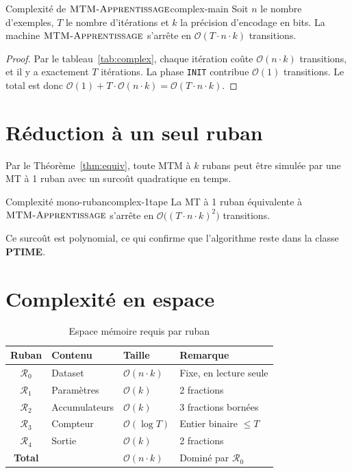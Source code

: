 \documentclass[12pt, a4paper, oneside]{report}
\newcommand{\mtmlong}{\textsc{MTM-Apprentissage}}
\newcommand{\state}[1]{\texttt{#1}}
\newcommand{\tape}[1]{\mathcal{R}_{#1}}
\begin{document}
\begin{thm}{Complexité de $\mtmlong$}{complex-main}
  Soit $n$ le nombre d'exemples, $T$ le nombre d'itérations et $k$ la précision d'encodage en bits. La machine $\mtmlong$ s'arrête en $\mathcal{O}(T \cdot n \cdot k)$ transitions.
\end{thm}

\begin{proof}
  Par le tableau~\ref{tab:complex}, chaque itération coûte $\mathcal{O}(n \cdot k)$ transitions, et il y a exactement $T$ itérations. La phase \state{INIT} contribue $\mathcal{O}(1)$ transitions. Le total est donc $\mathcal{O}(1) + T \cdot \mathcal{O}(n \cdot k) = \mathcal{O}(T \cdot n \cdot k)$.
\end{proof}

\section{Réduction à un seul ruban}

Par le Théorème~\ref{thm:equiv}, toute MTM à $k$ rubans peut être simulée par une MT à 1 ruban avec un surcoût quadratique en temps.

\begin{prop}{Complexité mono-ruban}{complex-1tape}
  La MT à 1 ruban équivalente à $\mtmlong$ s'arrête en $\mathcal{O}\bigl((T \cdot n \cdot k)^2\bigr)$ transitions.
\end{prop}

\noindent Ce surcoût est polynomial, ce qui confirme que l'algorithme reste dans la classe \textbf{PTIME}.

\section{Complexité en espace}

\begin{table}[H]
  \centering
  \caption{Espace mémoire requis par ruban}
  \label{tab:space}
  \renewcommand{\arraystretch}{1.3}
  \begin{tabular}{clll}
    \toprule
    \textbf{Ruban} & \textbf{Contenu} & \textbf{Taille} & \textbf{Remarque} \\
    \midrule
    $\tape{0}$ & Dataset       & $\mathcal{O}(n \cdot k)$  & Fixe, en lecture seule \\
    $\tape{1}$ & Paramètres    & $\mathcal{O}(k)$          & 2 fractions \\
    $\tape{2}$ & Accumulateurs & $\mathcal{O}(k)$          & 3 fractions bornées \\
    $\tape{3}$ & Compteur      & $\mathcal{O}(\log T)$     & Entier binaire $\leq T$ \\
    $\tape{4}$ & Sortie        & $\mathcal{O}(k)$          & 2 fractions \\
    \midrule
    \textbf{Total} & & $\mathcal{O}(n \cdot k)$ & Dominé par $\tape{0}$ \\
    \bottomrule
  \end{tabular}
\end{table}
\end{document}

